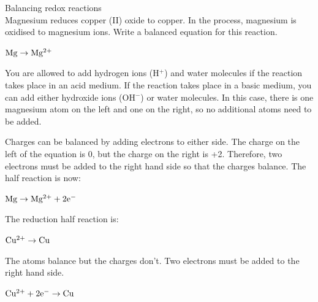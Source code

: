 \begin{wex}{Balancing redox reactions\\}{Magnesium reduces copper (II) oxide to copper. In the process, magnesium is oxidised to magnesium ions. Write a balanced equation for this reaction.\\}

{

\begin{center}
$\rm{Mg \rightarrow Mg^{2+}}$\\
\end{center}

You are allowed to add hydrogen ions (H$^{+}$) and water molecules if the reaction takes place in an acid medium. If the reaction takes place in a basic medium, you can add either hydroxide ions (OH$^{-}$) or water molecules. In this case, there is one magnesium atom on the left and one on the right, so no additional atoms need to be added.\\

Charges can be balanced by adding electrons to either side. The charge on the left of the equation is 0, but the charge on the right is +2. Therefore, two electrons must be added to the right hand side so that the charges balance. The half reaction is now:

\begin{center}
$\rm{Mg \rightarrow Mg^{2+} + 2e^{-}}$\\
\end{center}

The reduction half reaction is:

\begin{center}
$\rm{Cu^{2+} \rightarrow Cu}$
\end{center}

The atoms balance but the charges don't. Two electrons must be added to the right hand side.

\begin{center}
$\rm{Cu^{2+} + 2e^{-} \rightarrow Cu}$\\
\end{center}

}
\end{wex}
